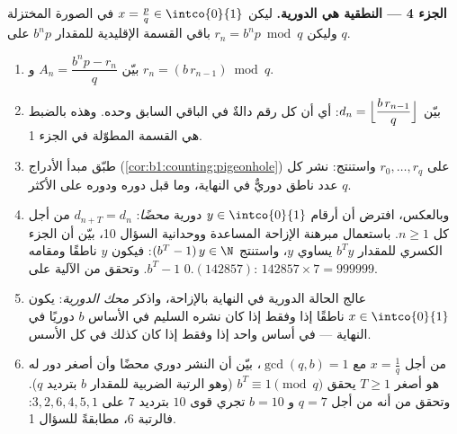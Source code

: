 \begin{problem}
\medskip
\noindent\textbf{الجزء 4 --- النطقية هي الدورية.} ليكن $x
= \frac pq \in \intco{0}{1}$ في الصورة المختزلة وليكن $r_n = b^n p
\bmod q$ باقي القسمة الإقليدية للمقدار $b^n p$ على
$q$.
\begin{enumerate}[resume]
  \item بيّن $A_n = \dfrac{b^n p - r_n}{q}$ و $r_n =
        (b\,r_{n-1}) \bmod q$.
  \item بيّن $d_n = \Bigl\lfloor \dfrac{b\,r_{n-1}}{q}
        \Bigr\rfloor$: أي أن كل رقم دالةٌ في الباقي
        السابق وحده. وهذه بالضبط هي القسمة المطوّلة في
        الجزء 1.
  \item طبّق مبدأ الأدراج
        (\cref{cor:b1:counting:pigeonhole}) على $r_0, \dots, r_q$
        واستنتج: نشر كل عدد ناطق دوريٌّ
        في النهاية، وما قبل دوره ودوره على الأكثر
        $q$.
  \item وبالعكس، افترض أن أرقام $y \in \intco{0}{1}$
        دورية \emph{محضًا}: $d_{n+T} = d_n$ من أجل كل $n
        \geq 1$. باستعمال مبرهنة الإزاحة المساعدة ووحدانية
        السؤال 10، بيّن أن الجزء الكسري للمقدار $b^T y$
        يساوي $y$، واستنتج $(b^T - 1)\,y \in \N$: فيكون $y$
        ناطقًا ومقامه  $b^T - 1$. وتحقق من
        الآلية على $0.(142857)$: $142857 \times 7 = 999999$.
  \item عالج الحالة الدورية في النهاية بالإزاحة، واذكر
        \emph{محك الدورية}: يكون $x \in \intco{0}{1}$
        ناطقًا إذا وفقط إذا كان نشره السليم في الأساس $b$
        دوريًا في النهاية --- في أساس واحد إذا وفقط إذا كان كذلك في
        كل الأسس.
  \item من أجل $x = \frac 1q$ مع $\gcd(q, b) = 1$، بيّن أن
        النشر دوري محضًا وأن أصغر دور له هو
        أصغر $T \geq 1$ يحقق $b^T \equiv 1 \pmod q$ (وهو
        الرتبة الضربية للمقدار $b$ بترديد $q$). وتحقق من أنه من أجل
        $q = 7$ و $b = 10$ تجري قوى $10$ بترديد $7$
        على $3, 2, 6, 4, 5, 1$: فالرتبة $6$، مطابقةً للسؤال
        1.
\end{enumerate}


\end{problem}
